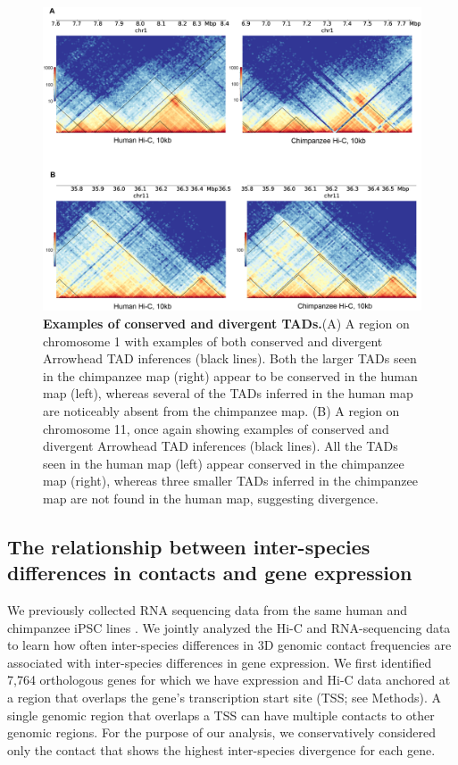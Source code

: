\begin{figure}
\centering
\includegraphics[width=6in]{img/fig5.PNG}
\caption[Examples of conserved and divergent TADs.]{\textbf{Examples of conserved and divergent TADs.}(A) A region on chromosome 1 with examples of both conserved and divergent Arrowhead \cite{Durand.2016} TAD inferences (black lines). Both the larger TADs seen in the chimpanzee map (right) appear to be conserved in the human map (left), whereas several of the TADs inferred in the human map are noticeably absent from the chimpanzee map. (B) A region on chromosome 11, once again showing examples of conserved and divergent Arrowhead TAD inferences (black lines). All the TADs seen in the human map (left) appear conserved in the chimpanzee map (right), whereas three smaller TADs inferred in the chimpanzee map are not found in the human map, suggesting divergence.}
\label{fig:fig5}
\end{figure}

\subsection{The relationship between inter-species differences in contacts and gene expression}

We previously collected RNA sequencing data from the same human and chimpanzee iPSC lines \cite{Pavlovic.2018}. We jointly analyzed the Hi-C and RNA-sequencing data to learn how often inter-species differences in 3D genomic contact frequencies are associated with inter-species differences in gene expression. We first identified 7,764 orthologous genes for which we have expression and Hi-C data anchored at a region that overlaps the gene's transcription start site (TSS; see Methods). A single genomic region that overlaps a TSS can have multiple contacts to other genomic regions. For the purpose of our analysis, we conservatively considered only the contact that shows the highest inter-species divergence for each gene.

